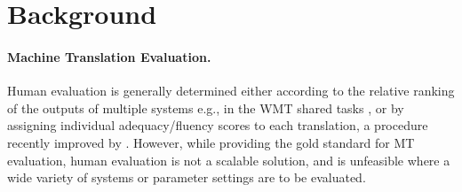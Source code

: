 \documentclass[11pt]{article}
\newcommand{\secref}[1]{Section \ref{#1}}
\begin{document}
\section{Background}\label{sec:background}





\paragraph{Machine Translation Evaluation.}
Human evaluation is generally determined
either according to the relative ranking of the outputs of multiple systems
e.g., in the WMT shared tasks \cite{bojar2015findings}, or by assigning
individual adequacy/fluency scores to each translation, a procedure recently improved
by .
However, while providing the gold standard for MT evaluation, human evaluation is not a scalable solution,
and is unfeasible where a wide variety of systems or parameter settings are to be evaluated.
\end{document}
